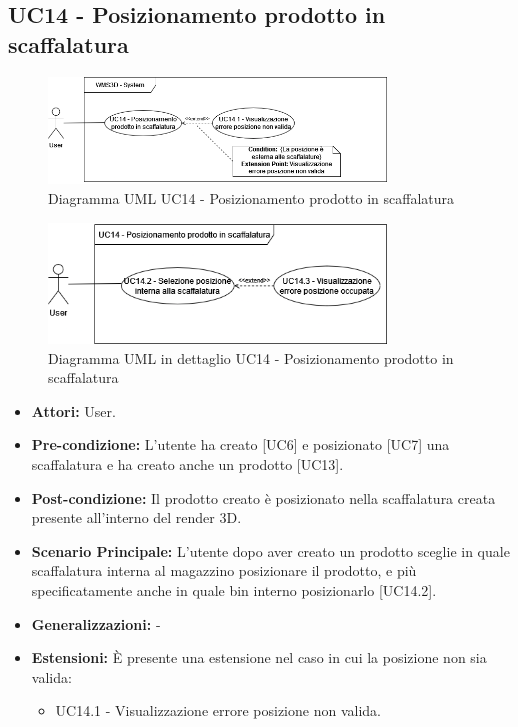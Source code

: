 \subsection{UC14 - Posizionamento prodotto in scaffalatura}
\begin{figure}[H]
  \centering
  \includegraphics[width=0.8\textwidth]{UC_diagrams_11-20/UC14_sys.drawio.png}
   \caption{Diagramma UML UC14 - Posizionamento prodotto in scaffalatura}
\end{figure}
\begin{figure}[H]
  \centering
  \includegraphics[width=0.8\textwidth]{UC_diagrams_11-20/UC14.drawio.png}
   \caption{Diagramma UML in dettaglio UC14 - Posizionamento prodotto in scaffalatura}
\end{figure}
\begin{itemize}
    \item \textbf{Attori:} User.
    \item \textbf{Pre-condizione:}  L'utente ha creato [UC6] e posizionato [UC7] una scaffalatura e ha creato anche un prodotto [UC13].
    \item \textbf{Post-condizione:} Il prodotto creato è posizionato nella scaffalatura creata presente all'interno del render 3D.
    \item \textbf{Scenario Principale:} L'utente dopo aver creato un prodotto sceglie in quale scaffalatura interna al magazzino posizionare il prodotto, e più specificatamente anche in quale bin interno posizionarlo [UC14.2].
    \item \textbf{Generalizzazioni:} -
    \item \textbf{Estensioni:} È presente una estensione nel caso in cui la posizione non sia valida:
    \begin{itemize}
        \item UC14.1 - Visualizzazione errore posizione non valida.
    \end{itemize}
\end{itemize}


